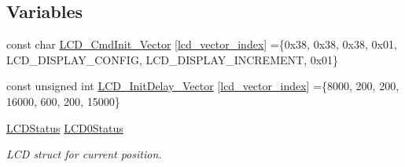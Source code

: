 \subsection*{Variables}
\begin{DoxyCompactItemize}
\item 
const char \hyperlink{group__lcd__h_gaf29aec3c2f771e62d84392f6d3fa1427}{L\-C\-D\-\_\-\-Cmd\-Init\-\_\-\-Vector} \mbox{[}\hyperlink{group__lcd__h_ga5b5f7e083c03030e46ef30ba2f9a4807}{lcd\-\_\-vector\-\_\-index}\mbox{]} =\{0x38, 0x38, 0x38, 0x01, L\-C\-D\-\_\-\-D\-I\-S\-P\-L\-A\-Y\-\_\-\-C\-O\-N\-F\-I\-G, L\-C\-D\-\_\-\-D\-I\-S\-P\-L\-A\-Y\-\_\-\-I\-N\-C\-R\-E\-M\-E\-N\-T, 0x01\}
\item 
const unsigned int \hyperlink{group__lcd__h_gaa94f066be94d030edb2bd88f7bd2b804}{L\-C\-D\-\_\-\-Init\-Delay\-\_\-\-Vector} \mbox{[}\hyperlink{group__lcd__h_ga5b5f7e083c03030e46ef30ba2f9a4807}{lcd\-\_\-vector\-\_\-index}\mbox{]} =\{8000, 200, 200, 16000, 600, 200, 15000\}
\item 
\hyperlink{struct_l_c_d_status}{L\-C\-D\-Status} \hyperlink{group__lcd__h_ga8c429a174db0bd2b9972ff4ffa348e41}{L\-C\-D0\-Status}
\begin{DoxyCompactList}\small\item\em L\-C\-D struct for current position. \end{DoxyCompactList}\end{DoxyCompactItemize}
